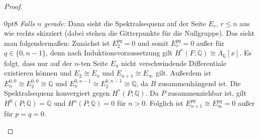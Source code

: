 \documentclass[11pt, a4paper, german]{article}
\theoremstyle{definition}
\theoremstyle{remark}
\newcommand{\Q}{\mathbb{Q}} %
\newcommand{\zeroDot}[2]{\node[draw,circle,inner sep=0.4pt,fill] at (#1,#2) {};} %
\begin{document}
\begin{proof}
  \renewcommand\windowpagestuff{
    \begin{center}\begin{tikzpicture}[x=16pt,y=16pt]\begin{scope}[shift={(0,0)}]
      \foreach \x in {1,2,3,5,6,7}{
        \foreach \y in {0,1,...,3}{
          \zeroDot{\x}{\y}
        }
      }
      \foreach \x in {0,...,8}{
        \zeroDot{\x}{4}
      }
      \foreach \y in {0,...,4}{
        \node at (9.5,\y) {$\cdots$};
      }
      \node at (0,0) {$\Q$\small $1$};
      \zeroDot{0}{1}
      \zeroDot{0}{2}
      \node at (0,3) {$\Q$\small $a$};
      \node at (4,0) {$\Q$\small $x$};
      \zeroDot{4}{1}
      \zeroDot{4}{2}
      \node at (4,3) {$\Q$\small $ax$};
      \draw[->,gray] (0.6,2.6) -- (3.4,0.4);
      \node at (8,0) {$\Q$\small $x^2$};
      \zeroDot{8}{1}
      \zeroDot{8}{2}
      \node at (8,3) {$\Q$\small $ax^2$};
      \draw[->,gray] (4.6,2.6) -- (7.4,0.4);
      \draw[->] (-0.7,-0.6) -- (10.3,-0.6); %
      \draw[->] (-0.7,-0.6) -- (-0.7,4.5); %
      \node[left] at (-0.7,0) {$0$};
      \node[left] at (-0.9,1.7) {\vdots};
      \node[left] at (-0.7,3) {$n{-}1$};
      \node[below] at (0,-0.6) {$0$};
      \node[below] at (2,-0.7) {$\cdots$};
      \node[below] at (4,-0.7) {$n$};
      \node[below] at (6,-0.7) {$\cdots$};
      \node[below] at (8,-0.6) {$2n$};
      \node[below] at (9.5,-0.7) {$\cdots$};
    \end{scope}\end{tikzpicture}\end{center}
  }
  \opencutright
  \begin{cutout}{0}{\dimexpr\linewidth-8cm\relax}{0pt}{8}
    \emph{Falls $n$ gerade:} \enspace
    Dann sieht die Spektralsequenz auf der Seite $E_r$, $r \leq n$ aus wie rechts skizziert (dabei stehen die Gitterpunkte für die Nullgruppe).
    Das sieht man folgendermaßen: Zunächst ist $E_2^{pq} = 0$ und somit $E_r^{pq} = 0$ außer für $q \in \{ 0, n{-}1 \}$, denn nach Induktionsvoraussetzung gilt $H^*(F; \Q) \cong \Lambda_\Q[x]$.
    Es folgt, dass nur auf der $n$-ten Seite $E_n$ nicht verschwindende Differentiale existieren können und $E_2 \cong E_n$ und $E_{n+1} \cong E_\infty$ gilt.
    Außerdem ist $E_n^{0,0} \cong E_2^{0,0} \cong \Q$ und $E_n^{0,n-1} \cong E_2^{0,n-1} \cong \Q$, da $B$ zusammenhängend ist.
    Die Spektralsequenz konvergiert gegen $H^*(P; \Q)$.
    Da $P$ zusammenziehbar ist, gilt $H^0(P; \Q) = \Q$ und $H^n(P; \Q) = 0$ für $n > 0$.
    Folglich ist $E_{n+1}^{pq} \cong E_\infty^{pq} = 0$ außer für $p = q = 0$.

\end{cutout}
\end{proof}
\end{document}

